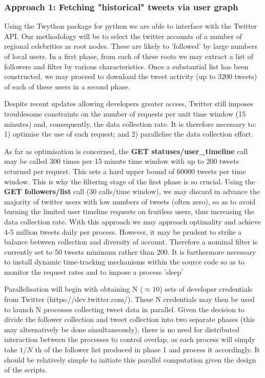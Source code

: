 \subsubsection*{Approach 1: Fetching "historical" tweets via user graph}

Using the Twython package for python we are able to interface with the Twitter API. Our methodology will be to select the twitter accounts of a number of regional celebrities as root nodes. These are likely to 'followed' by large numbers of local users. In a first phase, from each of these roots we may extract a list of followers and filter by various characteristics. Once a substantial list has been constructed, we may proceed to download the tweet activity (up to 3200 tweets) of each of these users in a second phase.

Despite recent updates allowing developers greater access, Twitter still imposes troublesome constraints on the number of requests per unit time window (15 minutes) and, consequently, the data collection rate. It is therefore necessary to: 1) optimise the use of each request; and 2) parallelise the data collection effort.

As far as optimisation is concerned, the \textbf{GET statuses/user\_timeline} call may be called 300 times per 15 minute time window with up to 200 tweets returned per request. This sets a hard upper bound of 60000 tweets per time window. This is why the filtering stage of the first phase is so crucial. Using the \textbf{GET followers/list} call (30 calls/time window), we may discard in advance the majority of twitter users with low numbers of tweets (often zero), so as to avoid burning the limited user timeline requests on fruitless users, thus increasing the data collection rate. With this approach we may approach optimality and achieve 4-5 million tweets daily per process. However, it may be prudent to strike a balance between collection and diversity of account. Therefore a nominal filter is currently set to 50 tweets minimum rather than 200. It is furthermore necessary to install dynamic time-tracking mechanisms within the source code so as to monitor the request rates and to impose a process 'sleep'

Parallelisation will begin with obtaining N ($\approx 10$) sets of developer credentials from Twitter (https://dev.twitter.com/). These N credentials may then be used to launch N processes collecting tweet data in parallel. Given the decision to divide the follower collection and tweet collection into two separate phases (this may alternatively be done simultaneously), there is no need for distributed interaction between the processes to control overlap, as each process will simply take $1/N$ th of the follower list produced in phase 1 and process it accordingly. It should be relatively simple to initiate this parallel computation given the design of the scripts.

